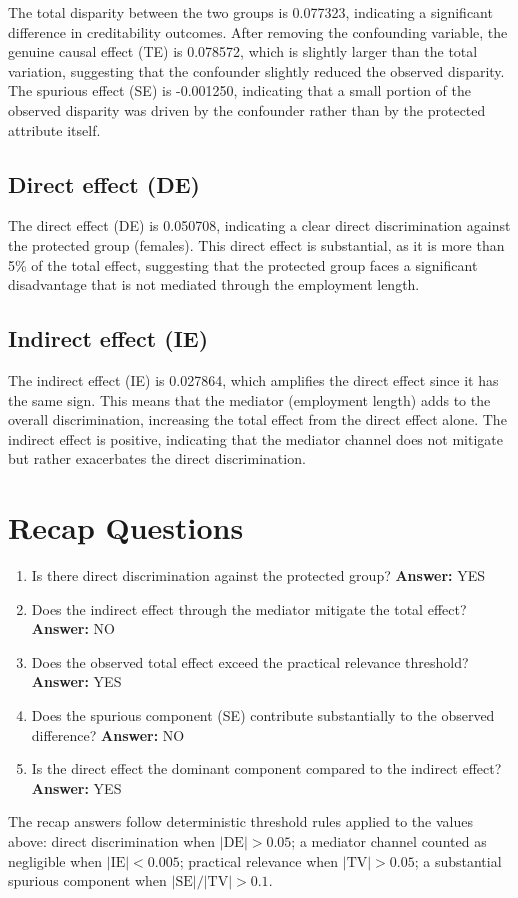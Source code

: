 \documentclass[11pt]{article}
\begin{document}
The total disparity between the two groups is 0.077323, indicating a significant difference in creditability outcomes. After removing the confounding variable, the genuine causal effect (TE) is 0.078572, which is slightly larger than the total variation, suggesting that the confounder slightly reduced the observed disparity. The spurious effect (SE) is -0.001250, indicating that a small portion of the observed disparity was driven by the confounder rather than by the protected attribute itself.

\subsection{Direct effect (DE)}

The direct effect (DE) is 0.050708, indicating a clear direct discrimination against the protected group (females). This direct effect is substantial, as it is more than 5\% of the total effect, suggesting that the protected group faces a significant disadvantage that is not mediated through the employment length.

\subsection{Indirect effect (IE)}

The indirect effect (IE) is 0.027864, which amplifies the direct effect since it has the same sign. This means that the mediator (employment length) adds to the overall discrimination, increasing the total effect from the direct effect alone. The indirect effect is positive, indicating that the mediator channel does not mitigate but rather exacerbates the direct discrimination.

\section{Recap Questions}

\begin{enumerate}
\item Is there direct discrimination against the protected group? \textbf{Answer:} YES
\item Does the indirect effect through the mediator mitigate the total effect? \textbf{Answer:} NO
\item Does the observed total effect exceed the practical relevance threshold? \textbf{Answer:} YES
\item Does the spurious component (SE) contribute substantially to the observed difference? \textbf{Answer:} NO
\item Is the direct effect the dominant component compared to the indirect effect? \textbf{Answer:} YES
\end{enumerate}

\vspace{1em}
\noindent\footnotesize
The recap answers follow deterministic threshold rules applied to the values above: direct discrimination when $|\mathrm{DE}| > 0.05$; a mediator channel counted as negligible when $|\mathrm{IE}| < 0.005$; practical relevance when $|\mathrm{TV}| > 0.05$; a substantial spurious component when $|\mathrm{SE}| / |\mathrm{TV}| > 0.1$.
\end{document}
